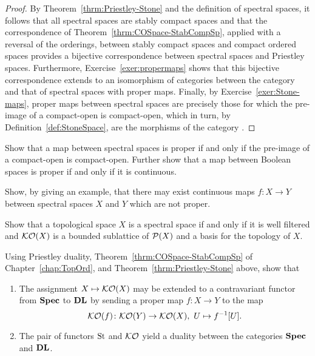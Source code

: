   \begin{proof}
  By Theorem~\ref{thrm:Priestley-Stone} and the definition of spectral spaces, it follows that
  all spectral spaces are stably compact spaces and that the correspondence of Theorem~\ref{thrm:COSpace-StabCompSp}, applied with a reversal of the orderings, %
   between stably compact spaces and compact ordered spaces provides a bijective correspondence between spectral spaces and Priestley spaces. Furthermore, Exercise~\ref{exer:propermaps} shows that this bijective correspondence extends to an isomorphism of categories between the category {\Priest} and that of spectral spaces with proper maps. Finally, by Exercise~\ref{exer:Stone-maps}, proper maps between spectral spaces are precisely those for which the pre-image of a compact-open is compact-open, which in turn, by Definition~\ref{def:StoneSpace}, are the morphisms of the category {\Spec}.
   \end{proof}


\exercises

\begin{exercise}\label{exer:Stone-maps}
Show that a map between spectral spaces is proper if and only if the pre-image of a compact-open is compact-open. Further show that  a map between Boolean spaces is proper if and only if it is continuous.
\end{exercise}

\begin{exercise}\label{exer:non-proper}
  Show, by giving an example, that there may exist continuous maps $f\colon X\to Y$ between spectral spaces $X$ and $Y$ which are not proper.
  \end{exercise}

\begin{exercise}\label{exer:Stone-spaces}
Show that a topological space $X$ is a spectral space if and only if it is well filtered and ${\mathcal{KO}}(X)$ is a bounded sublattice of $\mathcal{P}(X)$ and a basis for the topology of $X$.
\end{exercise}

\begin{exercise}\label{exer:Stone-duality}
Using Priestley duality, Theorem~\ref{thrm:COSpace-StabCompSp} of Chapter~\ref{chap:TopOrd}, and Theorem~\ref{thrm:Priestley-Stone} above, show that
\begin{enumerate}
\item The assignment $X\mapsto {\mathcal{KO}}(X)$ may be extended to a contravariant functor from $\mathbf{Spec}$ to $\mathbf{DL}$ by sending a proper map $f\colon X\to Y$ to the map
\[
\KO(f)\colon\KO(Y)\to\KO(X), \ U\mapsto f^{-1}[U].
\]
 \item The pair of functors $\mathrm{St}$ and $\mathcal{KO}$ yield a duality between the categories $\mathbf{Spec}$ and $\mathbf{DL}$.
\end{enumerate}
\end{exercise}


